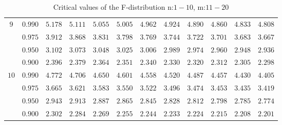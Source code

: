 \documentclass[11pt]{article}
\theoremstyle{definition}
\begin{document}
\begin{table}[H]
\begin{tabularx}{\linewidth}{c | c | c c c c c c c c c c}
		$9$ & $0.990$ & $5.178$ & $5.111$ & $5.055$ & $5.005$ & $4.962$ & $4.924$ & $4.890$ & $4.860$ & $4.833$ & $4.808$ \\
		& $0.975$ & $3.912$ & $3.868$ & $3.831$ & $3.798$ & $3.769$ & $3.744$ & $3.722$ & $3.701$ & $3.683$ & $3.667$ \\
		& $0.950$ & $3.102$ & $3.073$ & $3.048$ & $3.025$ & $3.006$ & $2.989$ & $2.974$ & $2.960$ & $2.948$ & $2.936$ \\
		& $0.900$ & $2.396$ & $2.379$ & $2.364$ & $2.351$ & $2.340$ & $2.330$ & $2.320$ & $2.312$ & $2.305$ & $2.298$ \\
		$10$ & $0.990$ & $4.772$ & $4.706$ & $4.650$ & $4.601$ & $4.558$ & $4.520$ & $4.487$ & $4.457$ & $4.430$ & $4.405$ \\
		& $0.975$ & $3.665$ & $3.621$ & $3.583$ & $3.550$ & $3.522$ & $3.496$ & $3.474$ & $3.453$ & $3.435$ & $3.419$ \\
		& $0.950$ & $2.943$ & $2.913$ & $2.887$ & $2.865$ & $2.845$ & $2.828$ & $2.812$ & $2.798$ & $2.785$ & $2.774$ \\
		& $0.900$ & $2.302$ & $2.284$ & $2.269$ & $2.255$ & $2.244$ & $2.233$ & $2.224$ & $2.215$ & $2.208$ & $2.201$
	\end{tabularx}
	\caption{Critical values of the F-distribution n:$1-10$, m:$11-20$}
\end{table}
\end{document}
